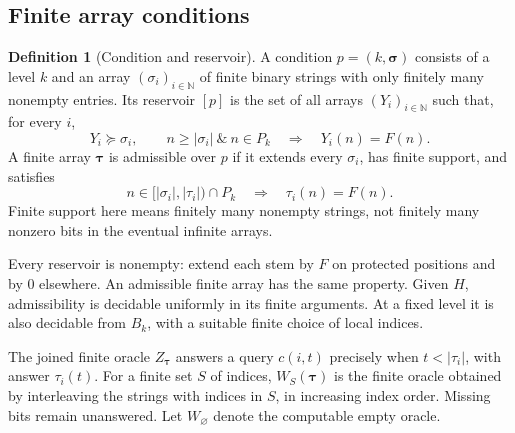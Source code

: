 \documentclass[11pt,letterpaper]{article}
\theoremstyle{definition}
\newtheorem{definition}[theorem]{Definition}
\theoremstyle{remark}\newtheorem{remark}[theorem]{Remark}
\numberwithin{equation}{section}
\newcommand{\N}{\mathbb N}
\begin{document}
\subsection{Finite array conditions}
\begin{definition}[Condition and reservoir]\label{cr13:def:condition}
A condition $p=(k,\boldsymbol\sigma)$ consists of a level $k$ and an array $(\sigma_i)_{i\in\N}$ of finite binary strings with only finitely many nonempty entries. Its reservoir $[p]$ is the set of all arrays $(Y_i)_{i\in\N}$ such that, for every $i$,
\begin{equation}\label{cr13:eq:reservoir}
 Y_i\succeq\sigma_i,\qquad
 n\ge|\sigma_i|\ \&\ n\in P_k\quad\Longrightarrow\quad Y_i(n)=F(n).
\end{equation}
A finite array $\boldsymbol\tau$ is admissible over $p$ if it extends every $\sigma_i$, has finite support, and satisfies
\[
 n\in[|\sigma_i|,|\tau_i|)\cap P_k
                 \quad\Longrightarrow\quad\tau_i(n)=F(n).
\]
Finite support here means finitely many nonempty strings, not finitely many nonzero bits in the eventual infinite arrays.
\end{definition}
Every reservoir is nonempty: extend each stem by $F$ on protected positions and by $0$ elsewhere. An admissible finite array has the same property. Given $H$, admissibility is decidable uniformly in its finite arguments. At a fixed level it is also decidable from $B_k$, with a suitable finite choice of local indices.

The joined finite oracle $Z_{\boldsymbol\tau}$ answers a query $c(i,t)$ precisely when $t<|\tau_i|$, with answer $\tau_i(t)$. For a finite set $S$ of indices, $W_S(\boldsymbol\tau)$ is the finite oracle obtained by interleaving the strings with indices in $S$, in increasing index order. Missing bits remain unanswered. Let $W_\varnothing$ denote the computable empty oracle.
\end{document}
